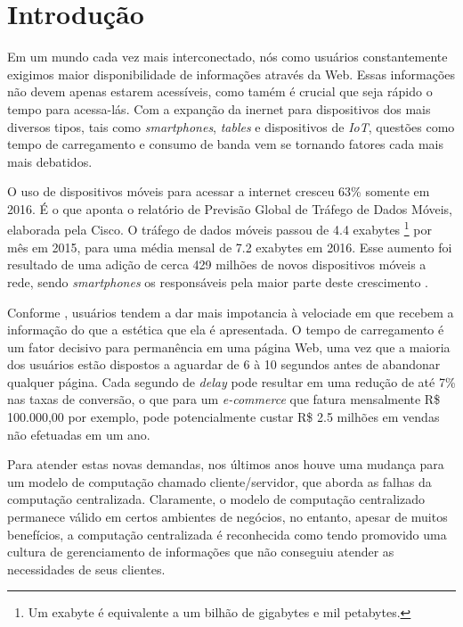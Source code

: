 \chapter[Introdução]{Introdução}


Em um mundo cada vez mais interconectado, nós como usuários constantemente exigimos maior disponibilidade de informações através da Web. Essas informações não devem apenas estarem acessíveis, como tamém é crucial que seja rápido o tempo para acessa-lás. Com a expanção da inernet para dispositivos dos mais diversos tipos, tais como \textit{smartphones}, \textit{tables} e dispositivos de \textit{IoT}, questões como tempo de carregamento e consumo de banda vem se tornando fatores cada mais mais debatidos.

O uso de dispositivos móveis para acessar a internet cresceu 63\% somente em 2016. É o que aponta o relatório de Previsão Global de Tráfego de Dados Móveis, elaborada pela Cisco. O tráfego de dados móveis passou de  4.4 exabytes \footnote{Um exabyte é equivalente a um bilhão de gigabytes e mil petabytes.} por mês em 2015, para uma média mensal de 7.2 exabytes em 2016. Esse aumento foi resultado de uma adição de cerca 429 milhões de novos dispositivos móveis a rede, sendo \textit{smartphones} os responsáveis pela maior parte deste crescimento \cite{cisco-network-report}.

Conforme , usuários tendem a dar mais impotancia à velociade em que recebem a informação do que a estética que ela é apresentada. O tempo de carregamento é um fator decisivo para permanência em uma página Web, uma vez que a maioria dos usuários estão dispostos a aguardar de 6 à 10 segundos antes de abandonar qualquer página. Cada segundo de \textit{delay} pode resultar em uma redução de até 7\% nas taxas de conversão, o que para um \textit{e-commerce} que fatura mensalmente R\$ 100.000,00 por exemplo, pode potencialmente custar R\$ 2.5 milhões em vendas não efetuadas em um ano.

Para atender estas novas demandas, nos últimos anos houve uma mudança para um modelo de computação chamado cliente/servidor, que aborda as falhas da computação centralizada. Claramente, o modelo de computação centralizado permanece válido em certos ambientes de negócios, no entanto, apesar de muitos benefícios, a computação centralizada é reconhecida como tendo promovido uma cultura de gerenciamento de informações que não conseguiu atender as necessidades de seus clientes.

